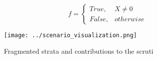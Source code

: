 \documentclass[a4paper]{article}
\begin{document}
\begin{equation}   f =
\begin{cases} True, & X \neq 0\\
False, & otherwise
\end{cases}
\end{equation}

\begin{figure}
\centering
\texttt{[image: ../scenario\_visualization.png]}
\caption{Fragmented strata and contributions to the scruti
}
\end{figure}
 
\end{document}
